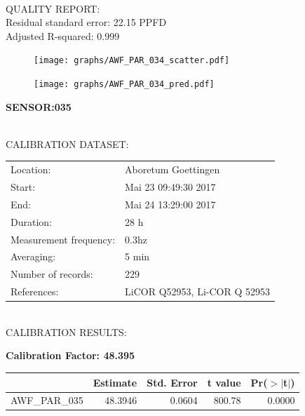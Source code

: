 \documentclass[oneside]{report}
\begin{document}
\hrulefill\\
QUALITY REPORT:\\
Residual standard error: 22.15 PPFD\\
Adjusted R-squared: 0.999



\begin{figure}[H]
  \centering
  \texttt{[image: graphs/AWF\_PAR\_034\_scatter.pdf]}
\end{figure}




\begin{figure}[H]
  \centering
  \texttt{[image: graphs/AWF\_PAR\_034\_pred.pdf]}
\end{figure}

\pagebreak


\begin{center}
\large{\textbf{SENSOR:035}}\\
\end{center}

\hrulefill\\
CALIBRATION DATASET:\\
\begin{table}[h!]
  \centering
  \label{tab:table1}
  \begin{tabular}{ll}
    Location: & Aboretum Goettingen\\ 
    
    
    Start:  & Mai 23 09:49:30 2017 \\
    End:   & Mai 24 13:29:00 2017\\ 
    Duration: & 28 h\\
    Measurement frequency: & 0.3hz\\
    Averaging:  &5 min\\
    Number of records: & 229 \\
    References: & LiCOR Q52953, Li-COR Q 52953 \\
  \end{tabular}
\end{table}

\hrulefill\\
CALIBRATION RESULTS:\\


\begin{center}
\textbf{\large{Calibration Factor: 48.395}}\\
\end{center}
\begin{table}[ht]
\centering
\begin{tabular}{rrrrr}
  \hline
 & Estimate & Std. Error & t value & Pr($>$$|$t$|$) \\ 
  \hline
AWF\_PAR\_035 & 48.3946 & 0.0604 & 800.78 & 0.0000 \\ 
   \hline
\end{tabular}
\end{table}
\end{document}
